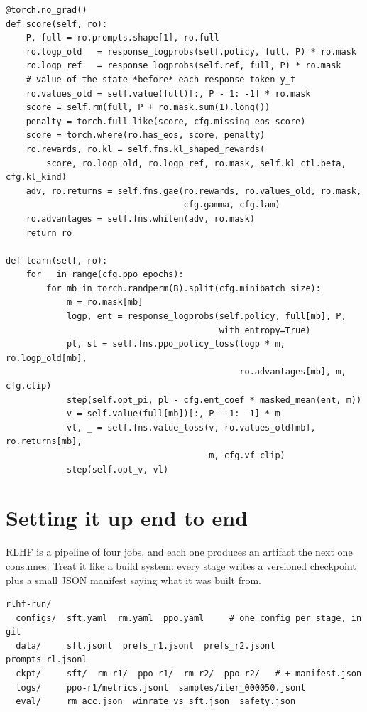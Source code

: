 \begin{lstlisting}[caption={The trainer's phases (\ident{llmsys/rlhf/ppo.py}, abridged). The losses come from an injectable module \code{fns}, so Lab 35 runs the whole system on your own implementations.},label={lst:rlhf:trainer}]
@torch.no_grad()
def score(self, ro):
    P, full = ro.prompts.shape[1], ro.full
    ro.logp_old   = response_logprobs(self.policy, full, P) * ro.mask
    ro.logp_ref   = response_logprobs(self.ref, full, P) * ro.mask
    # value of the state *before* each response token y_t
    ro.values_old = self.value(full)[:, P - 1: -1] * ro.mask
    score = self.rm(full, P + ro.mask.sum(1).long())
    penalty = torch.full_like(score, cfg.missing_eos_score)
    score = torch.where(ro.has_eos, score, penalty)
    ro.rewards, ro.kl = self.fns.kl_shaped_rewards(
        score, ro.logp_old, ro.logp_ref, ro.mask, self.kl_ctl.beta, cfg.kl_kind)
    adv, ro.returns = self.fns.gae(ro.rewards, ro.values_old, ro.mask,
                                   cfg.gamma, cfg.lam)
    ro.advantages = self.fns.whiten(adv, ro.mask)
    return ro

def learn(self, ro):
    for _ in range(cfg.ppo_epochs):
        for mb in torch.randperm(B).split(cfg.minibatch_size):
            m = ro.mask[mb]
            logp, ent = response_logprobs(self.policy, full[mb], P,
                                          with_entropy=True)
            pl, st = self.fns.ppo_policy_loss(logp * m, ro.logp_old[mb],
                                              ro.advantages[mb], m, cfg.clip)
            step(self.opt_pi, pl - cfg.ent_coef * masked_mean(ent, m))
            v = self.value(full[mb])[:, P - 1: -1] * m
            vl, _ = self.fns.value_loss(v, ro.values_old[mb], ro.returns[mb],
                                        m, cfg.vf_clip)
            step(self.opt_v, vl)
\end{lstlisting}

\section{Setting it up end to end}\label{sec:rlhf:setup}

RLHF is a pipeline of four jobs, and each one produces an artifact the next one consumes. Treat it
like a build system: every stage writes a versioned checkpoint plus a small JSON manifest saying
what it was built from.

\begin{lstlisting}[style=plain,caption={A project layout for an RLHF run.},label={lst:rlhf:layout}]
rlhf-run/
  configs/  sft.yaml  rm.yaml  ppo.yaml     # one config per stage, in git
  data/     sft.jsonl  prefs_r1.jsonl  prefs_r2.jsonl  prompts_rl.jsonl
  ckpt/     sft/  rm-r1/  ppo-r1/  rm-r2/  ppo-r2/   # + manifest.json
  logs/     ppo-r1/metrics.jsonl  samples/iter_000050.jsonl
  eval/     rm_acc.json  winrate_vs_sft.json  safety.json
\end{lstlisting}

